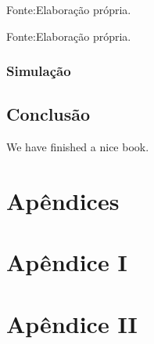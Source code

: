 \documentclass[
  12pt,
  a4paper,
  openany]{book}
\begin{document}
Fonte:Elaboração própria.

\justifying
\bigskip

\begin{table}[!h]

\caption{\label{tab:unnamed-chunk-28}Volatilidade Implícita}
\centering
{}
\end{table}
\FloatBarrier
\centering

Fonte:Elaboração própria.

\justifying
\bigskip

\hypertarget{simulauxe7uxe3o}{%
\section{Simulação}\label{simulauxe7uxe3o}}

\hypertarget{conclusuxe3o}{%
\chapter*{Conclusão}\label{conclusuxe3o}}

We have finished a nice book.

  

\part*{Apêndices}

\newpage
\part*{\normalfont\huge\bfseries\centering Apêndice I}
\newpage

\part*{\normalfont\huge\bfseries\centering Apêndice II}
\newpage
\end{document}
